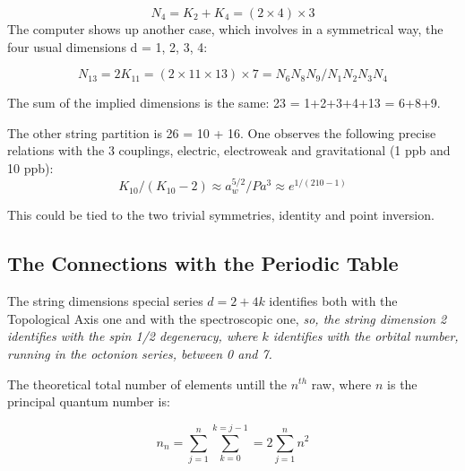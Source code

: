 \documentclass[a4paper,9pt]{article}
\newcounter{row}
\begin{document}
\begin{equation}\label{Eq43}
 N_4  = K_2 + K_4 = (2\times 4) \times 3
 \end{equation}
%
The computer shows up another case, which involves in a symmetrical way, the four usual dimensions d = 1, 2, 3, 4:

\begin{equation}\label{Eq44}
 N_{13}  = 2K_{11} = (2\times 11 \times 13)\times 7 = N_6N_8N_9/N_1N_2N_3N_4
 \end{equation}

The sum of the implied dimensions is the same: 23 = 1+2+3+4+13 = 6+8+9. 

The other string partition is 26 = 10 + 16. One observes the following precise relations with the 3 couplings, electric, electroweak and gravitational (1 ppb and 10 ppb):
\begin{equation}\label{Eq45}
K_{10}/(K_{10}-2) \approx a_w^{5/2}/ P a^3   \approx e^{1/(210-1)}
 \end{equation}

This could be tied to the two trivial symmetries, identity and point inversion. 
 






 
\subsection{The Connections with the Periodic Table}

The string dimensions special series $d= 2+4k$ identifies both with the Topological Axis one and with the spectroscopic one, \textit {so, the string dimension 2 identifies with the spin 1/2 degeneracy, where $k$ identifies with the orbital number, running in the octonion series, between 0 and 7.} 

The theoretical total number of elements untill the $n^{th}$ raw, where $n$ is the principal quantum number is:

\begin{equation}\label{Eq46}
n_n = \sum _{j=1}^{n}  \sum_{k=0}^{k=j-1} = 2 \sum _{j=1}^{n} n^2
 \end{equation}
\end{document}
